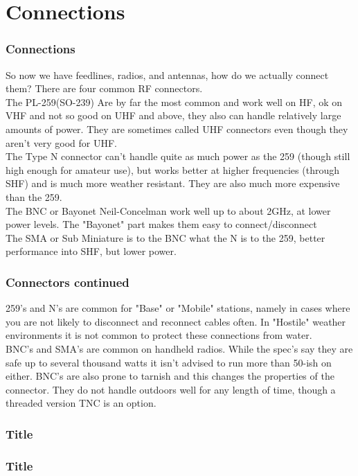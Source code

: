\documentclass[10pt]{beamer}
\begin{document}
\section{Connections}
\begin{frame}
\frametitle{Connections}
So now we have feedlines, radios, and antennas, how do we actually connect them? There are four common RF connectors.\pause\\
The PL-259(SO-239) Are by far the most common and work well on HF, ok on VHF and not so good on UHF and above, they also can handle relatively large amounts of power. They are sometimes called UHF connectors even though they aren't very good for UHF. \pause \\
The Type N connector can't handle quite as much power as the 259 (though still high enough for amateur use), but works better at higher frequencies (through SHF) and is much more weather resistant. They are also much more expensive than the 259. \pause \\
The BNC or Bayonet Neil-Concelman work well up to about 2GHz, at lower power levels. The "Bayonet" part makes them easy to connect/disconnect \pause \\
The SMA or Sub Miniature is to the BNC what the N is to the 259, better performance into SHF, but lower power.

\end{frame}

\begin{frame}
\frametitle{Connectors continued}
259's and N's are common for "Base" or "Mobile" stations, namely in cases where you are not likely to disconnect and reconnect cables often. In "Hostile" weather environments it is not common to protect these connections from water.\\
BNC's and SMA's are common on handheld radios. While the spec's say they are safe up to several thousand watts it isn't advised to run more than 50-ish on either. BNC's are also prone to tarnish and this changes the properties of the connector. They do not handle outdoors well for any length of time, though a threaded version TNC is an option.
\end{frame}

\begin{frame}
\frametitle{Title}

\end{frame}

\begin{frame}
\frametitle{Title}

\end{frame}
\end{document}
